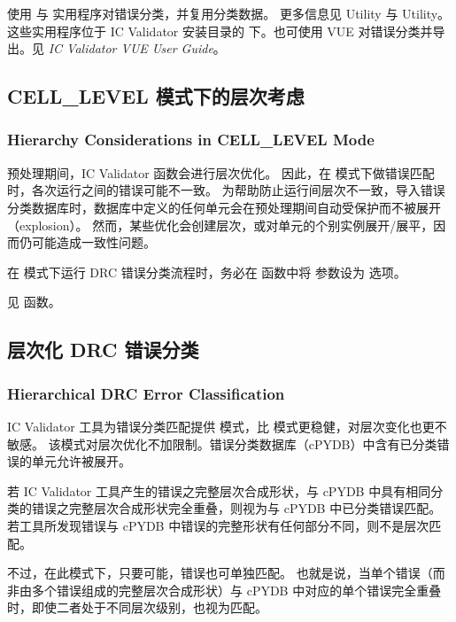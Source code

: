 使用  与  实用程序对错误分类，并复用分类数据。
更多信息见  Utility 与  Utility。
这些实用程序位于 IC Validator 安装目录的  下。也可使用 VUE 对错误分类并导出。见 \textit{IC Validator VUE User Guide}。

\subsection{CELL\_LEVEL 模式下的层次考虑}
\subsubsection*{Hierarchy Considerations in CELL\_LEVEL Mode}

预处理期间，IC Validator 函数会进行层次优化。
因此，在  模式下做错误匹配时，各次运行之间的错误可能不一致。
为帮助防止运行间层次不一致，导入错误分类数据库时，数据库中定义的任何单元会在预处理期间自动受保护而不被展开（explosion）。
然而，某些优化会创建层次，或对单元的个别实例展开/展平，因而仍可能造成一致性问题。

在  模式下运行 DRC 错误分类流程时，务必在  函数中将  参数设为  选项。

见  函数。

\subsection{层次化 DRC 错误分类}
\subsubsection*{Hierarchical DRC Error Classification}

IC Validator 工具为错误分类匹配提供  模式，比  模式更稳健，对层次变化也更不敏感。
该模式对层次优化不加限制。错误分类数据库（cPYDB）中含有已分类错误的单元允许被展开。

若 IC Validator 工具产生的错误之完整层次合成形状，与 cPYDB 中具有相同分类的错误之完整层次合成形状完全重叠，则视为与 cPYDB 中已分类错误匹配。
若工具所发现错误与 cPYDB 中错误的完整形状有任何部分不同，则不是层次匹配。

不过，在此模式下，只要可能，错误也可单独匹配。
也就是说，当单个错误（而非由多个错误组成的完整层次合成形状）与 cPYDB 中对应的单个错误完全重叠时，即使二者处于不同层次级别，也视为匹配。

